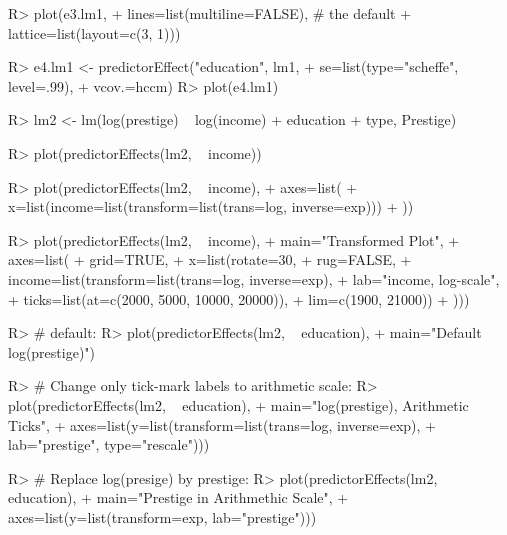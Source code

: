 \documentclass[
]{article}
\begin{document}
\begin{Schunk}
\begin{Sinput}
R> plot(e3.lm1,
+         lines=list(multiline=FALSE), # the default
+         lattice=list(layout=c(3, 1)))
\end{Sinput}
\end{Schunk}
\begin{Schunk}
\begin{Sinput}
R> e4.lm1 <- predictorEffect("education", lm1,
+                              se=list(type="scheffe", level=.99), 
+                              vcov.=hccm)
R> plot(e4.lm1)
\end{Sinput}
\end{Schunk}
\begin{Schunk}
\begin{Sinput}
R> lm2 <- lm(log(prestige) ~ log(income) + education + type, Prestige)
\end{Sinput}
\end{Schunk}
\begin{Schunk}
\begin{Sinput}
R> plot(predictorEffects(lm2, ~ income))
\end{Sinput}
\end{Schunk}
\begin{Schunk}
\begin{Sinput}
R> plot(predictorEffects(lm2, ~ income),
+         axes=list(
+           x=list(income=list(transform=list(trans=log, inverse=exp)))
+         ))
\end{Sinput}
\end{Schunk}
\begin{Schunk}
\begin{Sinput}
R> plot(predictorEffects(lm2, ~ income),
+         main="Transformed Plot",
+         axes=list(
+           grid=TRUE,
+           x=list(rotate=30,
+                  rug=FALSE,
+                  income=list(transform=list(trans=log, inverse=exp),
+                              lab="income, log-scale",
+                              ticks=list(at=c(2000, 5000, 10000, 20000)),
+                              lim=c(1900, 21000))
+           )))
\end{Sinput}
\end{Schunk}
\begin{Schunk}
\begin{Sinput}
R> # default:
R> plot(predictorEffects(lm2, ~ education),
+         main="Default log(prestige)")
\end{Sinput}
\begin{Sinput}
R> # Change only tick-mark labels to arithmetic scale:
R> plot(predictorEffects(lm2, ~ education),
+         main="log(prestige), Arithmetic Ticks",
+         axes=list(y=list(transform=list(trans=log, inverse=exp),
+                          lab="prestige", type="rescale")))
\end{Sinput}
\begin{Sinput}
R> # Replace log(presige) by prestige:
R> plot(predictorEffects(lm2, ~ education),
+         main="Prestige in Arithmethic Scale",
+         axes=list(y=list(transform=exp, lab="prestige")))
\end{Sinput}
\end{Schunk}
\end{document}
